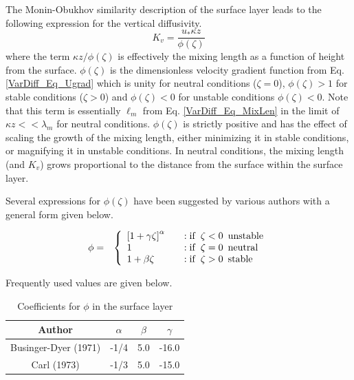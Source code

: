 The Monin-Obukhov similarity description of the surface layer leads to the following
expression for the vertical diffusivity.
\begin{equation}\label{VarDiff_Eq_Kz_Surf}
K_v = \frac{u_{*} \kappa z}{\phi(\zeta)}
\end{equation}
where the term $\kappa z / \phi(\zeta)$ is effectively the mixing length as a function of height from the
surface. $\phi(\zeta)$ is the dimensionless velocity gradient 
function from Eq. \ref{VarDiff_Eq_Ugrad} which is unity for neutral conditions ($\zeta=0$),
$\phi(\zeta)>1$ for stable conditions ($\zeta>0$) and $\phi(\zeta)<0$ for unstable
conditions $\phi(\zeta)<0$.
Note that this term is essentially $\ell_m$ from Eq. \ref{VarDiff_Eq_MixLen} in the limit of
$\kappa z << \lambda_m$ for neutral conditions. $\phi(\zeta)$ is strictly positive and
has the effect of scaling the growth of the mixing length, either minimizing it in
stable conditions, or magnifying it in unstable conditions. In neutral conditions, the
mixing length (and $K_v$) grows proportional to the distance from the surface within the
surface layer. 

Several expressions for $\phi(\zeta)$ have been suggested by various authors with a
general form given below.

\begin{eqnarray}\label{VarDiff_Eq_PhiB}
\phi &=& \left\{ \begin{array} {l@{\quad \quad}l}
 \left[ 1+\gamma \zeta\right]^{\alpha}  &:  \mathrm{if}\,\,\, \zeta < 0 \,\,\, \mathrm{unstable} \\
1                                       &:  \mathrm{if}\,\,\, \zeta = 0 \,\,\, \mathrm{neutral} \\
1 + \beta \zeta                         &:  \mathrm{if}\,\,\, \zeta > 0 \,\,\, \mathrm{stable}
\end{array}
\right.
\end{eqnarray}

Frequently used values are given below.
\small
\begin{table}[htbp]
\begin{center}
\begin{tabular}{| c | c | c | c |}
\hline
Author & $\alpha$ & $\beta$ & $\gamma$\\
\hline
Businger-Dyer (1971)     & -1/4 & 5.0 & -16.0 \\
Carl (1973)              & -1/3 & 5.0 & -15.0 \\
\hline
\end{tabular}
\caption{\label{Tab_VarDiff_phisurf}Coefficients for $\phi$ in the surface layer}
\end{center}
\end{table}
\normalsize

